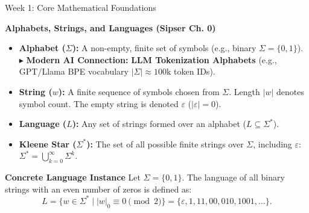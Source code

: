 \documentclass[aspectratio=169, 10pt]{beamer}
\begin{document}
\begin{frame}{Week 1: Core Mathematical Foundations}
  \begin{tcolorbox}[conceptcard]
    {\bfseries\footnotesize\color{gimpanavy} Alphabets, Strings, and Languages (Sipser Ch. 0)}
    \vspace{0.06cm}
    \begin{itemize}\setlength{\itemsep}{2.5pt}\footnotesize
      \item \textbf{Alphabet ($\Sigma$):} A non-empty, finite set of symbols (e.g., binary $\Sigma = \{0, 1\}$). \\
            {\scriptsize\color{gimpaaccent}$\blacktriangleright$ \textbf{Modern AI Connection:} \textbf{LLM Tokenization Alphabets} (e.g., GPT/Llama BPE vocabulary $|\Sigma| \approx 100\text{k}$ token IDs).}
      \item \textbf{String ($w$):} A finite sequence of symbols chosen from $\Sigma$. Length $|w|$ denotes symbol count. The empty string is denoted $\varepsilon$ ($|\varepsilon| = 0$).
      \item \textbf{Language ($L$):} Any set of strings formed over an alphabet ($L \subseteq \Sigma^*$).
      \item \textbf{Kleene Star ($\Sigma^*$):} The set of all possible finite strings over $\Sigma$, including $\varepsilon$: $\Sigma^* = \bigcup_{k=0}^{\infty} \Sigma^k$.
    \end{itemize}
  \end{tcolorbox}

  \vspace{0.08cm}
  \begin{tcolorbox}[examplecard]
    {\bfseries\footnotesize\color{accentGreen} Concrete Language Instance}
    \vspace{0.04cm}
    \footnotesize
    Let $\Sigma = \{0, 1\}$. The language of all binary strings with an even number of zeros is defined as:
    $$L = \bigl\{w \in \Sigma^* \;\big|\; |w|_0 \equiv 0 \pmod 2\bigr\} = \{\varepsilon, 1, 11, 00, 010, 1001, \ldots\}.$$
  \end{tcolorbox}
\end{frame}
\end{document}
